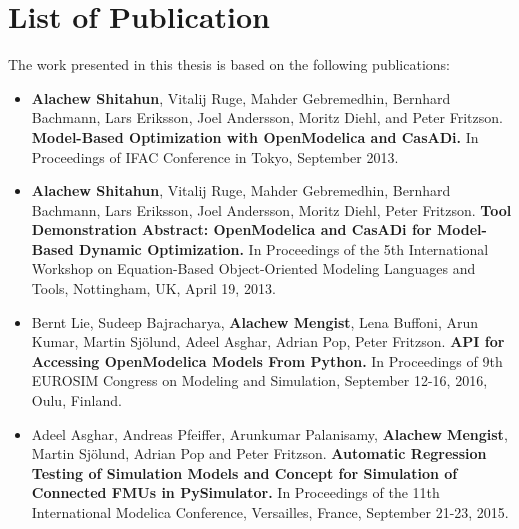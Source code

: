 \section{List of Publication}
\label{sec:List of Publication}


The work presented in this thesis is based on the following publications:


\begin{itemize}
	
\item[\begin{NoHyper} \cite{alachewoptimization} \end{NoHyper} ] \textbf{Alachew Shitahun}, Vitalij Ruge, Mahder Gebremedhin, Bernhard Bachmann, Lars Eriksson, Joel Andersson, Moritz Diehl, and Peter Fritzson. \textbf{Model-Based Optimization with OpenModelica and CasADi.} In Proceedings of IFAC Conference in Tokyo, September 2013. 

\item[\begin{NoHyper} \cite{alachewoptimizationdemo} \end{NoHyper}]  \textbf{Alachew Shitahun}, Vitalij Ruge, Mahder Gebremedhin, Bernhard Bachmann, Lars Eriksson, Joel Andersson, Moritz Diehl, Peter Fritzson. \textbf{Tool Demonstration Abstract: OpenModelica and CasADi for Model-Based Dynamic Optimization.} In Proceedings of the 5th International Workshop on Equation-Based Object-Oriented Modeling Languages and Tools, Nottingham, UK, April 19, 2013. 

\item[ \begin{NoHyper}  \cite{alachewompython} \end{NoHyper}] Bernt Lie, Sudeep Bajracharya, \textbf{Alachew Mengist}, Lena Buffoni, Arun Kumar, Martin Sj\"{o}lund, Adeel Asghar, Adrian Pop, Peter Fritzson.\textbf{ API for Accessing OpenModelica Models From Python.} In Proceedings of 9th EUROSIM Congress on Modeling and Simulation, September 12-16, 2016, Oulu, Finland. 

\item[\begin{NoHyper} \cite{alachewpysimulator} \end{NoHyper}]  Adeel Asghar, Andreas Pfeiffer, Arunkumar Palanisamy, \textbf{Alachew Mengist}, Martin Sj\"{o}lund, Adrian Pop and Peter Fritzson.\textbf{ Automatic Regression Testing of Simulation Models and Concept for Simulation of Connected FMUs in PySimulator.} In Proceedings of the 11th International Modelica Conference, Versailles, France, September 21-23, 2015. 


\end{itemize}

